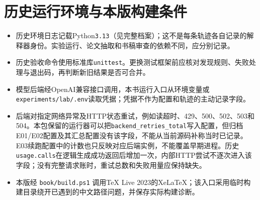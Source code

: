\section{历史运行环境与本版构建条件}

\begin{itemize}
  \item 历史环境日志记载Python\texttt{3.13}（见完整档案）；这不是每条轨迹各自记录的解释器身份。实验运行、论文抽取和书稿审查的依赖不同，应分别记录。
  \item 历史验收命令使用标准库\texttt{unittest}。更换测试框架前应核对发现规则、失败处理与退出码，再判断新旧结果是否可合并。
  \item 模型后端经OpenAI兼容接口调用，本书运行入口从环境变量或\texttt{experiments/lab/.env}读取凭据；凭据不作为配置和轨迹的主动记录字段。
  \item \begin{sloppypar}
        后端对指定网络异常及HTTP状态重试，例如读超时、429、500、502、503和504。本包保留的运行器可以把\texttt{backend\_retries\_total}写入配置，但归档E01/E02配置及其汇总配置没有该字段，不能从当前源码补称当时已记录。E03续跑配置中的计数也只反映对应后端实例，不能覆盖早期进程。历史\texttt{usage.calls}在逻辑生成成功返回后增加一次，内部HTTP尝试不逐次进入该字段；没有完整请求账时，重试总数和失败用量应保持缺失。
        \end{sloppypar}
  \item 本版经 \texttt{book/build.ps1} 调用TeX Live 2023的XeLaTeX；该入口采用临时构建目录绕开已遇到的中文路径问题，并保存实际构建诊断。
\end{itemize}
